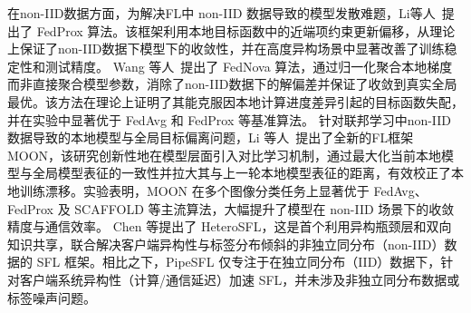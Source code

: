 在non-IID数据方面，为解决FL中 non-IID 数据导致的模型发散难题，Li等人~\cite{li2020federated}提出了 FedProx 算法。该框架利用本地目标函数中的近端项约束更新偏移，从理论上保证了non-IID数据下模型下的收敛性，并在高度异构场景中显著改善了训练稳定性和测试精度。%
Wang 等人~\cite{wang2020tackling}提出了 FedNova 算法，通过归一化聚合本地梯度而非直接聚合模型参数，消除了non-IID数据下的解偏差并保证了收敛到真实全局最优。该方法在理论上证明了其能克服因本地计算进度差异引起的目标函数失配，并在实验中显著优于 FedAvg 和 FedProx 等基准算法。
针对联邦学习中non-IID数据导致的本地模型与全局目标偏离问题，Li 等人~\cite{li2021model}提出了全新的FL框架MOON，该研究创新性地在模型层面引入对比学习机制，通过最大化当前本地模型与全局模型表征的一致性并拉大其与上一轮本地模型表征的距离，有效校正了本地训练漂移。实验表明，MOON 在多个图像分类任务上显著优于 FedAvg、FedProx 及 SCAFFOLD 等主流算法，大幅提升了模型在 non-IID 场景下的收敛精度与通信效率。
Chen 等\cite{chen2025heterosfl}提出了 HeteroSFL，这是首个利用异构瓶颈层和双向知识共享，联合解决客户端异构性与标签分布倾斜的非独立同分布（non-IID）数据的 SFL 框架。相比之下，PipeSFL\cite{gao2024pipesfl} 仅专注于在独立同分布（IID）数据下，针对客户端系统异构性（计算/通信延迟）加速 SFL，并未涉及非独立同分布数据或标签噪声问题。

